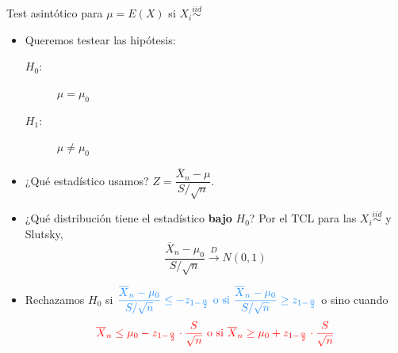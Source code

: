 \documentclass{beamer}
\theoremstyle{definition}
\begin{document}

\begin{frame}{\color{rosee}Test asint\'otico para $\mu=E(X)$ si $X_i\stackrel{iid}{\sim} $}\small
  
    \begin{itemize}
    \item Queremos testear las hip\'otesis:
      \begin{description}
      \item[$H_0$:] $\mu = \mu_0$
      \item[$H_1$:] $\mu \neq \mu_0$
      \end{description}
    \item ¿Qu\'e estad\'istico usamos? $Z = \dfrac{\overline{X}_n - \mu}{S/\sqrt{n}}$.
    \item ¿Qu\'e distribuci\'on tiene el estad\'istico \textbf{bajo} $H_0$? Por el TCL para las $X_i \stackrel{iid}{\sim}$ y Slutsky,
      \[ \dfrac{\overline{X}_n - \mu_0}{S/\sqrt{n}} \stackrel{D}{\rightarrow}N(0,1)\]
    \item Rechazamos $H_0$ si $\color{dodgerblue}\dfrac{\overline{X}_n - \mu_0}{S/\sqrt{n}} \leq -z_{1-\frac{\alpha}{2}} \mbox{ o si } \dfrac{\overline{X}_n - \mu_0}{S/\sqrt{n}} \geq z_{1-\frac{\alpha}{2}}$
      o sino cuando
      \[\color{red}\overline{X}_n \leq \mu_0 -z_{1-\frac{\alpha}{2}} \cdot \dfrac{S}{\sqrt{n}} \mbox{ o si }
        \overline{X}_n \geq \mu_0 + z_{1-\frac{\alpha}{2}} \cdot \dfrac{S}{\sqrt{n}}\]
    \end{itemize}

\end{frame}
\end{document}
